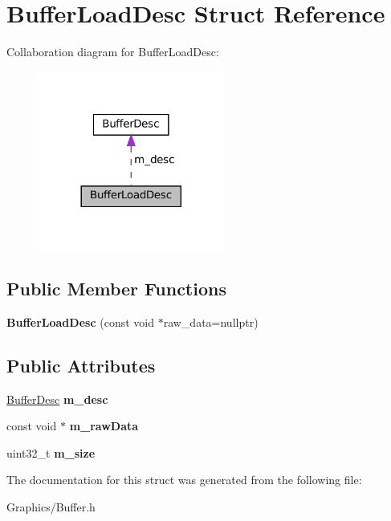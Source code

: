 \hypertarget{structBufferLoadDesc}{}\section{Buffer\+Load\+Desc Struct Reference}
\label{structBufferLoadDesc}


Collaboration diagram for Buffer\+Load\+Desc\+:\nopagebreak
\begin{figure}[H]
\begin{center}
\leavevmode
\includegraphics[width=173pt]{structBufferLoadDesc__coll__graph}
\end{center}
\end{figure}
\subsection*{Public Member Functions}
\begin{DoxyCompactItemize}
\item 
\mbox{\label{structBufferLoadDesc_a2d469bae2e844f9b0839702622ccf6fc}} 
{\bfseries Buffer\+Load\+Desc} (const void $\ast$raw\+\_\+data=nullptr)
\end{DoxyCompactItemize}
\subsection*{Public Attributes}
\begin{DoxyCompactItemize}
\item 
\mbox{\label{structBufferLoadDesc_a37d56783b4af4e75eb61cf820d7520da}} 
\hyperlink{structBufferDesc}{Buffer\+Desc} {\bfseries m\+\_\+desc}
\item 
\mbox{\label{structBufferLoadDesc_ae67e17527abc39c6045571fe8ea7fc87}} 
const void $\ast$ {\bfseries m\+\_\+raw\+Data}
\item 
\mbox{\label{structBufferLoadDesc_a12152f6fd71fb0ff2e4743d1424c143d}} 
uint32\+\_\+t {\bfseries m\+\_\+size}
\end{DoxyCompactItemize}


The documentation for this struct was generated from the following file\+:\begin{DoxyCompactItemize}
\item 
Graphics/Buffer.\+h\end{DoxyCompactItemize}
